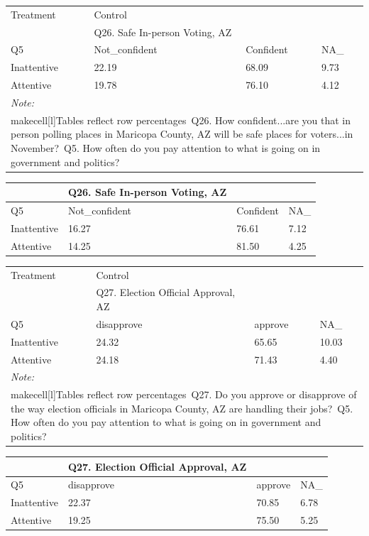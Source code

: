 \documentclass[
  11pt,
  a4paper,
]{article}
\begin{document}
\begin{table}
\centering
\centering
\begin{tabular}[t]{l|l|l|l}
\hline
\multicolumn{1}{l|}{Treatment} & \multicolumn{1}{l}{Control} \\
\cline{1-1} \cline{2-2}
 & Q26. Safe In-person Voting, AZ &  & \\
\hline
Q5 & Not\_confident & Confident & NA\_\\
\hline
Inattentive & 22.19 & 68.09 & 9.73\\
\hline
Attentive & 19.78 & 76.10 & 4.12\\
\hline
\multicolumn{4}{l}{\rule{0pt}{1em}\textit{Note: }}\\
\multicolumn{4}{l}{\rule{0pt}{1em}makecell[l]{Tables reflect row percentages\ Q26. How confident...are you that in person polling places in Maricopa County, AZ will be safe places for voters...in November?\ Q5. How often do you pay attention to what is going on in government and politics?}}\\
\end{tabular}
\centering
\begin{tabular}[t]{l|l|l|l}
\hline
 & Q26. Safe In-person Voting, AZ &  & \\
\hline
Q5 & Not\_confident & Confident & NA\_\\
\hline
Inattentive & 16.27 & 76.61 & 7.12\\
\hline
Attentive & 14.25 & 81.50 & 4.25\\
\hline
\end{tabular}
\end{table}

\begin{table}
\centering
\centering
\begin{tabular}[t]{l|l|l|l}
\hline
\multicolumn{1}{l|}{Treatment} & \multicolumn{1}{l}{Control} \\
\cline{1-1} \cline{2-2}
 & Q27. Election Official Approval, AZ &  & \\
\hline
Q5 & disapprove & approve & NA\_\\
\hline
Inattentive & 24.32 & 65.65 & 10.03\\
\hline
Attentive & 24.18 & 71.43 & 4.40\\
\hline
\multicolumn{4}{l}{\rule{0pt}{1em}\textit{Note: }}\\
\multicolumn{4}{l}{\rule{0pt}{1em}makecell[l]{Tables reflect row percentages\ Q27. Do you approve or disapprove of the way election officials in Maricopa County, AZ are handling their jobs?\ Q5. How often do you pay attention to what is going on in government and politics?}}\\
\end{tabular}
\centering
\begin{tabular}[t]{l|l|l|l}
\hline
 & Q27. Election Official Approval, AZ &  & \\
\hline
Q5 & disapprove & approve & NA\_\\
\hline
Inattentive & 22.37 & 70.85 & 6.78\\
\hline
Attentive & 19.25 & 75.50 & 5.25\\
\hline
\end{tabular}
\end{table}
\end{document}
